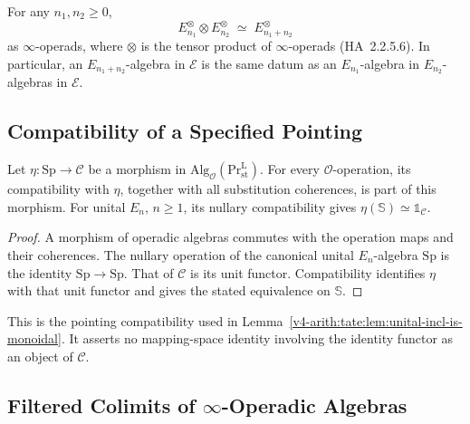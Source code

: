 \begin{theorem}
\label{v4-arith:tate:thm:dunn-additivity}
\ClaimStatusProvedElsewhere For any \(n_{1},n_{2}\geq 0\),
\[
E_{n_{1}}^{\otimes}\otimes E_{n_{2}}^{\otimes}\;\simeq\;E_{n_{1}+n_{2}}^{\otimes}
\]
as \(\infty\)-operads, where \(\otimes\) is the tensor product of
\(\infty\)-operads (HA~2.2.5.6). In particular, an
\(E_{n_{1}+n_{2}}\)-algebra in \(\mathcal{E}\) is the same datum as an
\(E_{n_{1}}\)-algebra in \(E_{n_{2}}\)-algebras in \(\mathcal{E}\).
\end{theorem}

\subsection{Compatibility of a Specified Pointing}
\label{v4-arith:tate:prelim-central}

\begin{theorem}
\label{v4-arith:tate:thm:unit-central}
Let \(\eta:\mathrm{Sp}\to\mathcal C\) be a morphism in
\(\mathrm{Alg}_{\mathcal O}(\mathrm{Pr}^{\mathrm L}_{\mathrm{st}})\).
For every \(\mathcal O\)-operation, its compatibility with
\(\eta\), together with all substitution coherences, is part of
this morphism. For unital \(E_n\), \(n\geq1\), its nullary
compatibility gives \(\eta(\mathbb S)\simeq\mathbb 1_{\mathcal C}\).
\end{theorem}

\begin{proof}
A morphism of operadic algebras commutes with the operation maps
and their coherences. The nullary operation of the canonical
unital \(E_n\)-algebra \(\mathrm{Sp}\) is the identity
\(\mathrm{Sp}\to\mathrm{Sp}\). That of \(\mathcal C\) is its unit
functor. Compatibility identifies \(\eta\) with that unit functor
and gives the stated equivalence on \(\mathbb S\).
\end{proof}

This is the pointing compatibility used in
Lemma~\ref{v4-arith:tate:lem:unital-incl-is-monoidal}. It asserts
no mapping-space identity involving the identity functor as an
object of \(\mathcal C\).

\subsection{Filtered Colimits of \(\infty\)-Operadic Algebras}

